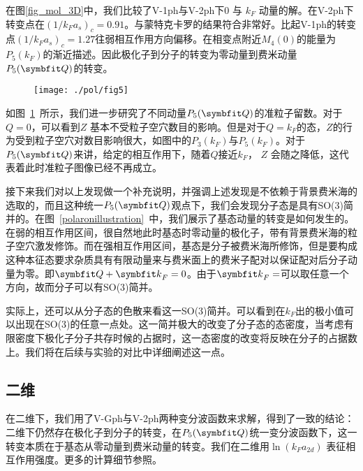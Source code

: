 在图\ref{fig_mol_3D}中，我们比较了V-1ph与V-2ph下$0$ 与 $k_F$ 动量的解。在V-2ph下转变点在$(1/k_Fa_s)_c=0.91$。与蒙特克卡罗的结果符合非常好\cite{Prokoffermi,Prokofbold}。比起V-1ph的转变点$(1/k_Fa_s)_c=1.27$往弱相互作用方向偏移。在相变点附近$M_4(0)$的能量为$P_5(k_F)$的渐近描述。因此极化子到分子的转变为零动量到费米动量$P_5(\Vector{Q})$的转变。

\begin{figure}[t]
\centering
\texttt{[image: ./pol/fig5]}
\label{fig_z}
\end{figure}

如图~\ref{fig_z}~所示，我们进一步研究了不同动量$P_5(\Vector{Q})$的准粒子留数。对于$Q=0$，可以看到$Z$ 基本不受粒子空穴数目的影响。但是对于$Q=k_F$的态，$Z$的行为受到粒子空穴对数目影响很大，如图中的$P_3(k_F)$与$P_5(k_F)$。对于$P_5(\Vector{Q})$来讲，给定的相互作用下，随着$Q$接近$k_F$， $Z$ 会随之降低，这代表着此时准粒子图像已经不再成立。


接下来我们对以上发现做一个补充说明，并强调上述发现是不依赖于背景费米海的选取的，而且这种统一$P_5(\Vector{Q})$观点下，我们会发现分子态是具有SO(3)简并的。在图~\ref{polaronillustration}~中，我们展示了基态动量的转变是如何发生的。在弱的相互作用区间，很自然地此时基态时零动量的极化子，带有背景费米海的粒子空穴激发修饰。而在强相互作用区间，基态是分子被费米海所修饰，但是要构成这种本征态要求杂质具有有限动量来与费米面上的费米子配对以保证配对后分子动量为零。即${\Vector{Q} }+{\Vector{k}}_F=0$。由于${\Vector{k}}_F=$可以取任意一个方向，故而分子可以有SO(3)简并。

实际上，还可以从分子态的色散来看这一SO(3)简并。可以看到在$k_F$出的极小值可以出现在SO(3)的任意一点处。这一简并极大的改变了分子态的态密度，当考虑有限密度下极化子分子共存时候的占据时，这一态密度的改变将反映在分子的占据数上。我们将在后续与实验的对比中详细阐述这一点。

\subsection{二维}
在二维下，我们用了V-Gph与V-2ph两种变分波函数来求解，得到了一致的结论：二维下仍然存在极化子到分子的转变，在$P_5(\Vector{Q})$统一变分波函数下，这一转变本质在于基态从零动量到费米动量的转变。我们在二维用$\ln(k_Fa_{2d})$ 表征相互作用强度。更多的计算细节参照\cite{Peng2021Nature}。


